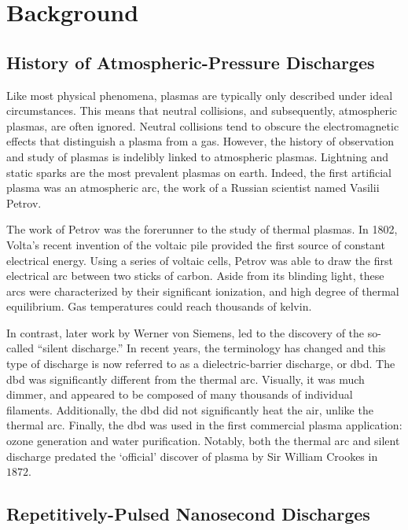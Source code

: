 \section{Background}

\subsection{History of Atmospheric-Pressure Discharges}

Like most physical phenomena, plasmas are typically only described under ideal
circumstances. This means that neutral collisions, and subsequently, atmospheric
plasmas, are often ignored. Neutral collisions tend to obscure the
electromagnetic effects that distinguish a plasma from a gas. However, the
history of observation and study of plasmas is indelibly linked to atmospheric
plasmas. Lightning and static sparks are the most prevalent plasmas on earth.
Indeed, the first artificial plasma was an atmospheric arc, the work of a
Russian scientist named Vasilii Petrov.

The work of Petrov was the forerunner to the study of thermal plasmas. In 1802,
Volta's recent invention of the voltaic pile provided the first source of
constant electrical energy. Using a series of voltaic cells, Petrov was able to
draw the first electrical arc between two sticks of carbon. Aside from its
blinding light, these arcs were characterized by their significant ionization,
and high degree of thermal equilibrium. Gas temperatures could reach thousands
of kelvin.

In contrast, later work by Werner von Siemens, led to the discovery of the
so-called ``silent discharge.'' In recent years, the terminology has changed and
this type of discharge is now referred to as a dielectric-barrier discharge, or
\acs{dbd}. The \acs{dbd} was significantly different from the thermal arc.
Visually, it was much dimmer, and appeared to be composed of many thousands of
individual filaments. Additionally, the \acs{dbd} did not significantly heat the
air, unlike the thermal arc. Finally, the \acs{dbd} was used in the first
commercial plasma application: ozone generation and water purification. Notably,
both the thermal arc and silent discharge predated the `official' discover of
plasma by Sir William Crookes in $1872$.


\subsection{Repetitively-Pulsed Nanosecond Discharges}

